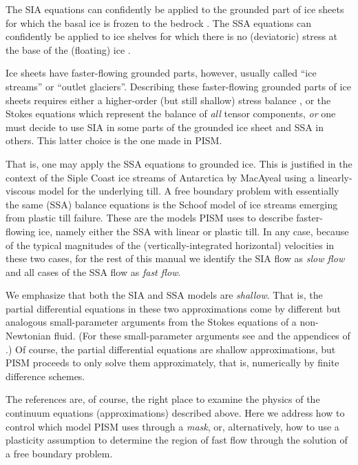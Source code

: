 \documentclass[11pt,final]{amsart}
\begin{document}
The SIA equations can confidently be applied to the grounded part of ice sheets for which the basal ice is frozen to the bedrock \cite{Fowler}.  The SSA equations can confidently be applied to ice shelves for which there is no (deviatoric) stress at the base of the (floating) ice \cite{Morland,MorlandZainuddin}.

Ice sheets have faster-flowing grounded parts, however, usually called ``ice streams'' or ``outlet glaciers''.  Describing these faster-flowing grounded parts of ice sheets requires either a higher-order (but still shallow) stress balance \cite{Blatter}, or the Stokes equations which represent the balance of \emph{all} tensor components, \emph{or} one must decide to use SIA in some parts of the grounded ice sheet and SSA in others.  This latter choice is the one made in PISM.

That is, one may apply the SSA equations to grounded ice.  This is justified in the context of the Siple Coast ice streams of Antarctica by MacAyeal \cite{MacAyeal,HulbeMacAyeal} using a linearly-viscous model for the underlying till.  A free boundary problem with essentially the same (SSA) balance equations is the Schoof \cite{SchoofStream} model of ice streams emerging from plastic till failure.  These are the models PISM uses to describe faster-flowing ice, namely either the SSA with linear or plastic till.  In any case, because of the typical magnitudes of the (vertically-integrated horizontal) velocities in these two cases, for the rest of this manual we identify the SIA flow as \emph{slow flow} and all cases of the SSA flow as \emph{fast flow}.

We emphasize that both the SIA and SSA models are \emph{shallow}.  That is, the partial differential equations in these two approximations come by different but analogous small-parameter arguments from the Stokes equations of a non-Newtonian fluid.  (For these small-parameter arguments see \cite{Fowler} and the appendices of \cite{SchoofStream}.)  Of course, the partial differential equations are shallow approximations, but PISM proceeds to only solve them approximately, that is, numerically by finite difference schemes.

The references are, of course, the right place to examine the physics of the continuum equations (approximations) described above.  Here we address how to control which model PISM uses through a \emph{mask}, or, alternatively, how to use a plasticity assumption to determine the region of fast flow through the solution of a free boundary problem.
\end{document}
